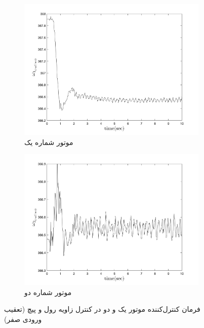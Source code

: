 \begin{figure}
	[width=12cm]
	\centering
	\begin{subfigure}
		\centering
		\includegraphics[width=12cm]{../Figures/Calibration/LQIDG/Roll_Pitch/lqidg_Omega_1.png}
		\caption{موتور شماره یک}
	\end{subfigure}
	\begin{subfigure}
	\centering
	\includegraphics[width=12cm]{../Figures/Calibration/LQIDG/Roll_Pitch/lqidg_Omega_2.png}
	\caption{موتور شماره دو}
\end{subfigure}
	\caption{‫‪فرمان کنترل‌کننده موتور یک و دو در کنترل زاویه رول و پیچ (تعقیب ورودی صفر)}
\end{figure}


